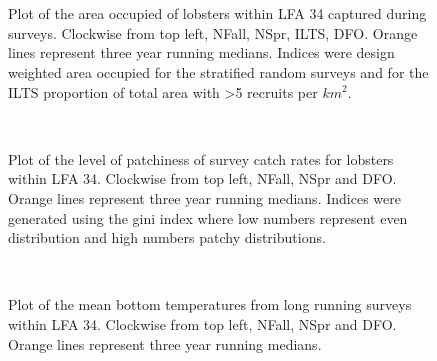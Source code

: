\documentclass[11pt]{article}
\newcommand{\e}{/SpinDr/backup/bio_data/bio.lobster/figures/LFA3438Framework2019/} %
\begin{document}
\begin{figure}
        \centering
    \\
                \\
        
         \caption{Plot of the area occupied of lobsters within LFA 34 captured during surveys. Clockwise from top left, NFall, NSpr, ILTS, DFO.
         Orange lines represent three year running medians. Indices were design weighted area occupied for the stratified random surveys and for the ILTS proportion of total area with \textgreater 5 recruits per $km^2$.}
        \end{figure}

    
\begin{figure}
        \centering
    \\
        
         \caption{Plot of the level of patchiness of survey catch rates for lobsters within LFA 34. Clockwise from top left, NFall, NSpr and DFO.
         Orange lines represent three year running medians. Indices were generated using the gini index where low numbers represent even distribution and high numbers patchy distributions.}
        \end{figure}


    
\begin{figure}
        \centering
    \\
        
         \caption{Plot of the mean bottom temperatures from long running surveys within LFA 34. Clockwise from top left, NFall, NSpr and DFO.
         Orange lines represent three year running medians.}
        \end{figure}
\end{document}
